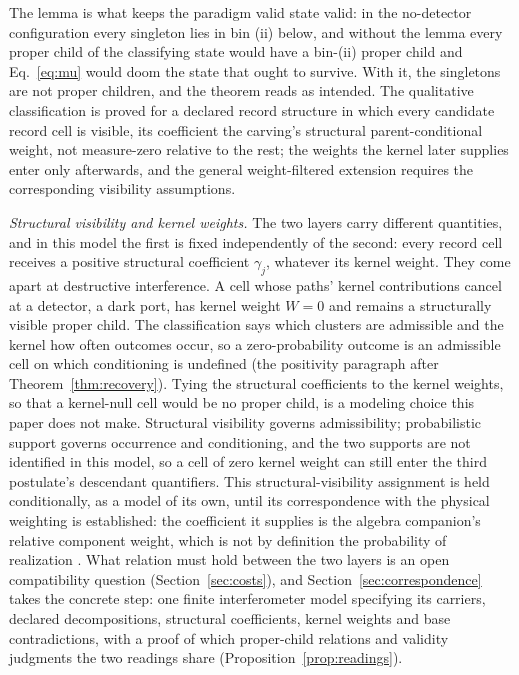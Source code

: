 \noindent The lemma is what keeps the paradigm valid state valid: in the no-detector configuration every singleton lies in bin (ii) below, and without the lemma every proper child of the classifying state would have a bin-(ii) proper child and Eq.~\eqref{eq:mu} would doom the state that ought to survive. With it, the singletons are not proper children, and the theorem reads as intended. The qualitative classification is proved for a declared record structure in which every candidate record cell is visible, its coefficient the carving's structural parent-conditional weight, not measure-zero relative to the rest; the weights the kernel later supplies enter only afterwards, and the general weight-filtered extension requires the corresponding visibility assumptions.

\noindent\textit{Structural visibility and kernel weights.} The two layers carry different quantities, and in this model the first is fixed independently of the second: every record cell receives a positive structural coefficient $\gamma_j$, whatever its kernel weight. They come apart at destructive interference. A cell whose paths' kernel contributions cancel at a detector, a dark port, has kernel weight $W = 0$ and remains a structurally visible proper child. The classification says which clusters are admissible and the kernel how often outcomes occur, so a zero-probability outcome is an admissible cell on which conditioning is undefined (the positivity paragraph after Theorem~\ref{thm:recovery}). Tying the structural coefficients to the kernel weights, so that a kernel-null cell would be no proper child, is a modeling choice this paper does not make. Structural visibility governs admissibility; probabilistic support governs occurrence and conditioning, and the two supports are not identified in this model, so a cell of zero kernel weight can still enter the third postulate's descendant quantifiers. This structural-visibility assignment is held conditionally, as a model of its own, until its correspondence with the physical weighting is established: the coefficient it supplies is the algebra companion's relative component weight, which is not by definition the probability of realization \cite{AethusTree}. What relation must hold between the two layers is an open compatibility question (Section~\ref{sec:costs}), and Section~\ref{sec:correspondence} takes the concrete step: one finite interferometer model specifying its carriers, declared decompositions, structural coefficients, kernel weights and base contradictions, with a proof of which proper-child relations and validity judgments the two readings share (Proposition~\ref{prop:readings}).

